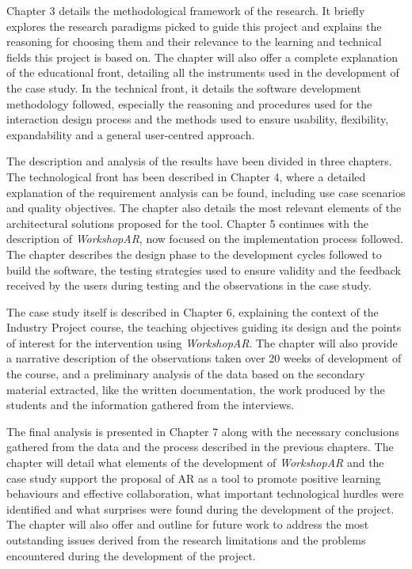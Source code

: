 Chapter 3 details the methodological framework of the research. It briefly explores the research paradigms picked to guide this project and explains the reasoning for choosing them and
their relevance to the learning and technical fields this project is based on. The chapter will also offer a complete explanation of the educational front, detailing all the instruments
used in the development of the case study. In the technical front, it details the software development methodology followed, especially the reasoning and procedures used for the
interaction design process and the methods used to ensure usability, flexibility, expandability and a general user-centred approach.

The description and analysis of the results have been divided in three chapters. The technological front has been described in Chapter 4, where a detailed explanation of the requirement
analysis can be found, including use case scenarios and quality objectives. The chapter also details the most relevant elements of the architectural solutions proposed for the tool.
Chapter 5 continues with the description of \emph{WorkshopAR}, now focused on the implementation process followed. The chapter describes the design phase to the development cycles followed to
build the software, the testing strategies used to ensure validity and the feedback received by the users during testing and the observations in the case study.

The case study itself is described in Chapter 6, explaining the context of the Industry Project course, the teaching objectives guiding its design and the points of interest for the
intervention using \emph{WorkshopAR}. The chapter will also provide a narrative description of the observations taken over 20 weeks of development of the course, and a preliminary analysis of the
data based on the secondary material extracted, like the written documentation, the work produced by the students and the information gathered from the interviews.

The final analysis is presented in Chapter 7 along with the necessary conclusions gathered from the data and the process described in the previous chapters. The chapter will detail what
elements of the development of \emph{WorkshopAR} and the case study support the proposal of AR as a tool to promote positive learning behaviours and effective collaboration, what important
technological hurdles were identified and what surprises were found during the development of the project. The chapter will also offer and outline for future work to address the most
outstanding issues derived from the research limitations and the problems encountered during the development of the project.
